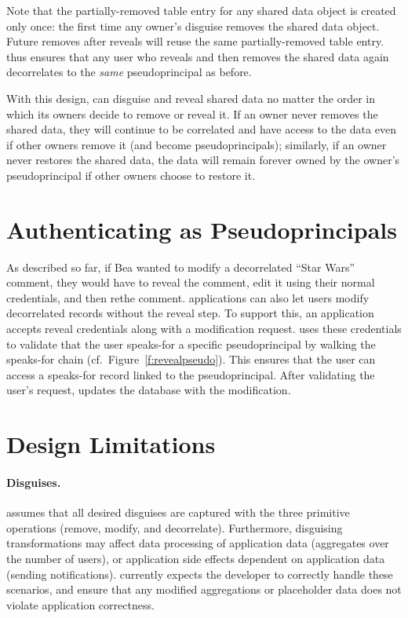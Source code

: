 Note that the partially-removed table entry for any shared data object is
created only once: the first time any owner's disguise removes the shared data
object. Future removes after reveals will reuse the same partially-removed table
entry.
%
\sys thus ensures that any user who reveals and then removes the shared data
again decorrelates to the \emph{same} pseudoprincipal as before.

%
With this design, \sys can disguise and reveal shared data no matter the order
in which its owners decide to remove or reveal it. If an owner never removes the
shared data, they will continue to be correlated and have access to the data
even if other owners remove it (and become pseudoprincipals); similarly, if an
owner never restores the shared data, the data will remain forever owned by the
owner's pseudoprincipal if other owners choose to restore it.
%





\section{Authenticating as Pseudoprincipals}

As described so far, if Bea wanted to modify a decorrelated ``Star Wars''
comment, they would have to reveal the comment, edit it using their normal
credentials, and then re\xx the comment.
%
\sys applications can also let users modify decorrelated records without the
reveal step.
%
To support this, an application accepts reveal credentials along with a
modification request. \sys uses these credentials to validate that the user
speaks-for a specific pseudoprincipal by walking the speaks-for chain (cf.\
Figure~\ref{f:revealpseudo}). This ensures that the user can access a speaks-for
record linked to the pseudoprincipal. After validating the user's request, \sys updates
the database with the modification.
%
%

\section{Design Limitations}
\label{s:design:limits}

\paragraph{Disguises.}
\sys assumes that all desired disguises are captured with the three primitive
operations (remove, modify, and decorrelate).
%
Furthermore, disguising transformations may affect data processing of
application data (\eg aggregates over the number of users), or application side
effects dependent on application data (\eg sending notifications).  \sys
currently expects the developer to correctly handle these scenarios, and ensure
that any modified aggregations or placeholder data does not violate application
correctness.
%

